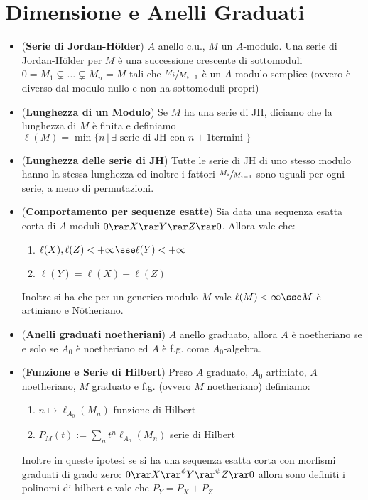 \documentclass[a4paper,NoNotes,GeneralMath]{stdmdoc}
\newcommand{\cl}{\ell}
\newcommand{\pipe}{\,|\,}
\begin{document}
\section*{Dimensione e Anelli Graduati}
\begin{itemize}
\item ({\bf Serie di Jordan-Hölder}) $A$ anello c.u., $M$ un
  $A$-modulo. Una serie di Jordan-Hölder per $M$ è una successione
  crescente di sottomoduli
  $0 = M_1 \subsetneq \ldots \subsetneq M_n = M$ tali che
  $\sfrac{M_i}{M_{i-1}}$ è un $A$-modulo semplice (ovvero è diverso dal
  modulo nullo e non ha sottomoduli propri)
\item ({\bf Lunghezza di un Modulo}) Se $M$ ha una serie di JH, diciamo
  che la lunghezza di $M$ è finita e definiamo
  $\cl(M) = \min \{ n \pipe \exists \text{ serie di JH con } n+1 \text{
    termini } \}$
\item ({\bf Lunghezza delle serie di JH}) Tutte le serie di JH di uno
  stesso modulo hanno la stessa lunghezza ed inoltre i fattori
  $\sfrac{M_i}{M_{i-1}}$ sono uguali per ogni serie, a meno di
  permutazioni.
\item ({\bf Comportamento per sequenze esatte}) Sia data una sequenza
  esatta corta di $A$-moduli $0 \rar X \rar Y \rar Z \rar 0$. Allora
  vale che:
  \begin{enumerate}
  \item $\cl(X), \cl(Z) < +\infty \sse \cl(Y) < +\infty$
  \item $\cl(Y) = \cl(X) + \cl(Z)$
  \end{enumerate}
  Inoltre si ha che per un generico modulo $M$ vale $\cl(M) < \infty
  \sse M$ è artiniano e Nötheriano.
\item ({\bf Anelli graduati noetheriani}) $A$ anello graduato, allora
  $A$ è noetheriano se e solo se $A_0$ è noetheriano ed $A$ è f.g. come
  $A_0$-algebra.
\item ({\bf Funzione e Serie di Hilbert}) Preso $A$ graduato, $A_0$
  artiniato, $A$ noetheriano, $M$ graduato e f.g. (ovvero $M$
  noetheriano) definiamo:
  \begin{enumerate}
  \item $n \mapsto \cl_{A_0}(M_n)$ funzione di Hilbert
  \item $P_M(t) := \sum_n t^n \cl_{A_0}(M_n)$ serie di Hilbert
  \end{enumerate}
  Inoltre in queste ipotesi se si ha una sequenza esatta corta con
  morfismi graduati di grado zero:
  $0 \rar X \rar^\phi Y \rar^\psi Z \rar 0$ allora sono definiti i
  polinomi di hilbert e vale che $P_Y = P_X + P_Z$

\end{itemize}
\end{document}
